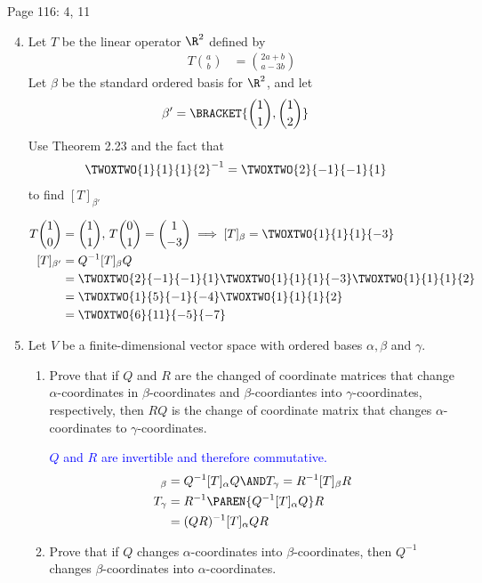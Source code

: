 \documentclass[10pt,a4paper]{report}
\newcommand{\BLUE}[1]{\textcolor{blue}{#1}}
\begin{document}
Page 116: 4, 11
\begin{enumerate}[label=Page 116:\arabic*)]
	\setcounter{enumi}{3}
	\item Let $T$ be the linear operator $\R^2$ defined by 
	\begin{align*}
		T\binom{a}{b} &= \binom{2a+b}{a-3b}
	\end{align*}Let $\beta$ be the standard ordered basis for $\R^2$, and let 
	\begin{align*}
		\beta' &= \BRACKET{\binom{1}{1}, \binom{1}{2}}
	\end{align*}Use Theorem 2.23 and the fact that
	\begin{align*}
		\TWOXTWO{1}{1}{1}{2}^{-1} &= \TWOXTWO{2}{-1}{-1}{1}
	\end{align*}to find $[T]_{\beta'}$
	
	\BLUE{\begin{align*}
		T\binom{1}{0} &= \binom{1}{1}, \, T\binom{0}{1} = \binom{1}{-3}\implies [T]_\beta = \TWOXTWO{1}{1}{1}{-3}\\
		[T]_{\beta'} &= Q^{-1}[T]_\beta Q\\\
		&= \TWOXTWO{2}{-1}{-1}{1}\TWOXTWO{1}{1}{1}{-3}\TWOXTWO{1}{1}{1}{2} \\
		&= \TWOXTWO{1}{5}{-1}{-4}\TWOXTWO{1}{1}{1}{2} \\
		&= \TWOXTWO{6}{11}{-5}{-7}
	\end{align*}
	}
	\setcounter{enumi}{10}
	\item Let $V$ be a finite-dimensional vector space with ordered bases $\alpha, \beta$ and $\gamma$.
	\begin{enumerate}[label=(\alph*)]
		\item Prove that if $Q$ and $R$ are the changed of coordinate matrices that change $\alpha$-coordinates in $\beta$-coordinates and $\beta$-coordiantes into $\gamma$-coordinates, respectively, then $RQ$ is the change of coordinate matrix that changes $\alpha$-coordinates to $\gamma$-coordinates.
		
		\BLUE{$Q$ and $R$ are invertible and therefore commutative.\begin{align*}
			[T]_\beta &= Q^{-1}[T]_\alpha Q \AND T_\gamma = R^{-1}[T]_\beta R \\
			T_\gamma &= R^{-1}\PAREN{Q^{-1}[T]_\alpha Q} R \\			
			&= (QR)^{-1}[T]_\alpha QR
		\end{align*}		
		}
		\item Prove that if $Q$ changes $\alpha$-coordinates into $\beta$-coordinates, then $Q^{-1}$ changes $\beta$-coordinates into $\alpha$-coordinates.
	
	\end{enumerate}
\end{enumerate}
\end{document}
